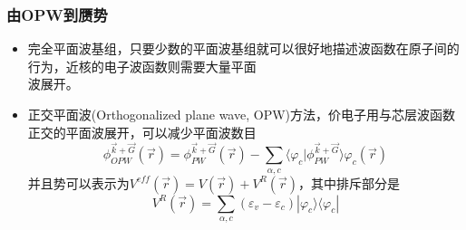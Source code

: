 \documentclass[cjk,slidestop,compress,mathserif,blue]{beamer}
\begin{document}

\frame
{
\frametitle{由OPW到赝势}
\begin{itemize}
\setlength{\itemsep}{5pt}
	\item 完全平面波基组，只要少数的平面波基组就可以很好地描述波函数在原子间的行为，近核的电子波函数则需要大量平面\\波展开。%
	\item 正交平面波(\textrm{Orthogonalized plane wave, OPW})方法，价电子用与芯层波函数正交的平面波展开，可以减少平面波数目
		\begin{displaymath}
			\phi_{OPW}^{\vec k+\vec G}(\vec r)=\phi_{PW}^{\vec k+\vec G}(\vec r)-\sum_{\alpha,c}\langle\varphi_c|\phi_{PW}^{\vec k+\vec G}\rangle\varphi_c(\vec r)
		\end{displaymath}
		并且势可以表示为$V^{eff}(\vec r)=V(\vec r)+V^R(\vec r)$，其中排斥部分是$$V^R(\vec r)=\sum_{\alpha,c}(\varepsilon_v-\varepsilon_c)|\varphi_c\rangle\langle\varphi_c|$$
\end{itemize}
}
\end{document}
